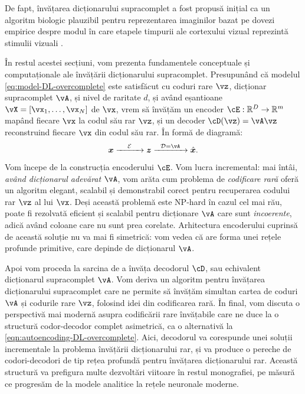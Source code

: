 \documentclass[../../book-main_ro.tex]{subfiles}
\begin{document}
De fapt, învățarea dicționarului supracomplet a fost propusă inițial ca un algoritm biologic plauzibil pentru reprezentarea imaginilor bazat pe dovezi empirice despre modul în care etapele timpurii ale cortexului vizual reprezintă stimulii vizuali \cite{Olshausen1996-ap,Olshausen1997-yv}.

În restul acestei secțiuni, vom prezenta fundamentele conceptuale și computaționale ale învățării dicționarului supracomplet.
Presupunând că modelul \eqref{eq:model-DL-overcomplete} este satisfăcut cu
coduri rare \(\vz\), dicționar supracomplet \(\vA\), și nivel de raritate \(d\),
și având eșantioane \(\vX = [\vx_1, \dots, \vx_N]\) de \(\vx\), vrem să învățăm
un encoder \(\cE : \R^D \to \R^m\) mapând fiecare \(\vx\) la {codul său rar}
\(\vz\), și un decoder \(\cD(\vz) = \vA \vz\) reconstruind fiecare \(\vx\) din
codul său rar. %
În formă de diagramă:
\begin{equation}
\x \xrightarrow{\hspace{4mm} \mathcal{E} \hspace{4mm}}  \z \xrightarrow{\hspace{2mm} \mathcal{D} = \vA \hspace{2mm}}   \hat{\x}.  
\label{eqn:autoencoding-DL-overcomplete}
\end{equation}

Vom începe de la construcția encoderului $\cE$.
Vom lucra incremental: mai întâi, \textit{având dicționarul adevărat $\vA$}, vom arăta cum problema de \textit{codificare rară} oferă un algoritm elegant, scalabil și demonstrabil corect pentru recuperarea codului rar $\vz$ al lui $\vx$.
Deși această problemă este NP-hard în cazul cel mai rău, poate fi rezolvată eficient și scalabil pentru dicționare $\vA$ care sunt \textit{incoerente}, adică având coloane care nu sunt prea corelate.
Arhitectura encoderului cuprinsă de această soluție nu va mai fi simetrică: vom vedea că are forma unei rețele profunde primitive, care depinde de dicționarul $\vA$.

Apoi vom proceda la sarcina de a învăța decodorul $\cD$, sau echivalent dicționarul supracomplet $\vA$.
Vom deriva un algoritm pentru învățarea dicționarului supracomplet care ne permite 
să învățăm simultan cartea de coduri $\vA$ și codurile rare $\vz$, folosind idei din codificarea rară.
În final, vom discuta o perspectivă mai modernă asupra codificării rare învățabile care ne duce la o structură codor-decodor complet asimetrică, ca o alternativă la \eqref{eqn:autoencoding-DL-overcomplete}.
Aici, decodorul va corespunde unei soluții incrementale la problema învățării dicționarului rar, și va produce o pereche de codori-decodori de tip rețea profundă pentru învățarea dicționarului rar.
Această structură va prefigura multe dezvoltări viitoare în restul
monografiei, pe măsură ce progresăm de la modele analitice la rețele neuronale moderne.
\end{document}
